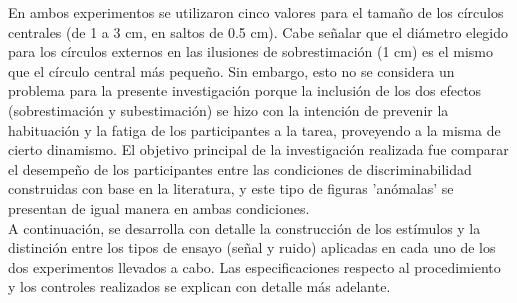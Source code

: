 En ambos experimentos se utilizaron cinco valores para el tamaño de los círculos centrales (de 1 a 3 cm, en saltos de 0.5 cm). Cabe señalar que el diámetro elegido para los círculos externos en las ilusiones de sobrestimación (1 cm) es el mismo que el círculo central más pequeño. Sin embargo, esto no se considera un problema para la presente investigación porque la inclusión de los dos efectos (sobrestimación y subestimación) se hizo con la intención de prevenir la habituación y la fatiga de los participantes a la tarea, proveyendo a la misma de cierto dinamismo. El objetivo principal de la investigación realizada fue comparar el desempeño de los participantes entre las condiciones de discriminabilidad construidas con base en la literatura, y este tipo de figuras 'anómalas' se presentan de igual manera en ambas condiciones.\\

A continuación, se desarrolla con detalle la construcción de los estímulos y la distinción entre los tipos de ensayo (señal y ruido) aplicadas en cada uno de los dos experimentos llevados a cabo. Las especificaciones respecto al procedimiento y los controles realizados se explican con detalle más adelante.\\

